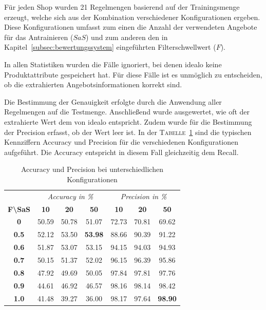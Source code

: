 Für jeden Shop wurden 21 Regelmengen basierend auf der Trainingsmenge erzeugt, welche sich aus der Kombination
verschiedener Konfigurationen ergeben.
Diese Konfigurationen umfasst zum einen die Anzahl der verwendeten Angebote für das Antrainieren ($SaS$) und zum
anderen den in Kapitel~\ref{subsec:bewertungssystem} eingeführten Filterschwellwert ($F$).

In allen Statistiken wurden die Fälle ignoriert, bei denen idealo keine Produktattribute gespeichert hat.
Für diese Fälle ist es unmöglich zu entscheiden, ob die extrahierten Angebotsinformationen korrekt sind.

Die Bestimmung der Genauigkeit erfolgte durch die Anwendung aller Regelmengen auf die Testmenge.
Anschließend wurde ausgewertet, wie oft der extrahierte Wert dem von idealo entspricht.
Zudem wurde für die Bestimmung der Precision erfasst, ob der Wert leer ist.
In der \textsc{Tabelle}~\ref{tab:accuracy-precision} sind die typischen Kennziffern Accuracy und Precision für die
verschiedenen Konfigurationen aufgeführt.
Die Accuracy entspricht in diesem Fall gleichzeitig dem Recall.

\begin{table}[h]
    \centering
    \begin{tabular}{ c | c c c | c c c }
        &   \multicolumn{3}{c}{\textit{Accuracy in \%}}    &   \multicolumn{3}{c}{\textit{Precision in \%}} \\
        \textbf{F\textbackslash SaS} & \textbf{10} & \textbf{20} & \textbf{50} & \textbf{10} & \textbf{20} & \textbf{50}  \\
        \hline
        \textbf{0}       &   50.59 &   50.78 &   51.07         &   72.73 &   70.81 &   69.62 \\
        \textbf{0.5}     &   52.12 &   53.50 &   \textbf{53.98}&   88.66 &   90.39 &   91.22 \\
        \textbf{0.6}     &   51.87 &   53.07 &   53.15         &   94.15 &   94.03 &   94.93 \\
        \textbf{0.7}     &   50.15 &   51.37 &   52.02         &   96.15 &   96.39 &   95.86 \\
        \textbf{0.8}     &   47.92 &   49.69 &   50.05         &   97.84 &   97.81 &   97.76 \\
        \textbf{0.9}     &   44.61 &   46.92 &   46.57         &   98.16 &   98.14 &   98.42 \\
        \textbf{1.0}     &   41.48 &   39.27 &   36.00         &   98.17 &   97.64 &   \textbf{98.90}

    \end{tabular}
    \caption{Accuracy und Precision bei unterschiedlichen Konfigurationen}
    \label{tab:accuracy-precision}
\end{table}


